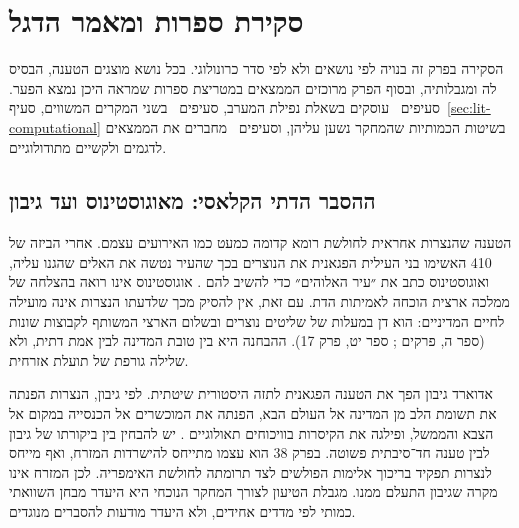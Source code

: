 
\chapter{סקירת ספרות ומאמר הדגל}
\label{ch:literature}

הסקירה בפרק זה בנויה לפי נושאים ולא לפי סדר כרונולוגי. בכל נושא מוצגים הטענה, הבסיס לה ומגבלותיה, ובסוף הפרק מרוכזים הממצאים במטריצת ספרות שמראה היכן נמצא הפער. סעיפים~\LR{\ref{sec:lit-classic}--\ref{sec:lit-wealth}} עוסקים בשאלת נפילת המערב, סעיפים~\LR{\ref{sec:lit-east}--\ref{sec:lit-franks}} בשני המקרים המשווים, סעיף~\ref{sec:lit-computational} בשיטות הכמותיות שהמחקר נשען עליהן, וסעיפים~\LR{\ref{sec:lit-models}--\ref{sec:lit-method-issues}} מחברים את הממצאים לדגמים ולקשיים מתודולוגיים.

\section{ההסבר הדתי הקלאסי: מאוגוסטינוס ועד גיבון}
\label{sec:lit-classic}

הטענה שהנצרות אחראית לחולשת רומא קדומה כמעט כמו האירועים עצמם. אחרי הביזה של 410 האשימו בני העילית הפגאנית את הנוצרים בכך שהעיר נטשה את האלים שהגנו עליה, ואוגוסטינוס כתב את ״עיר האלוהים״ כדי להשיב להם \cite{augustine_citygod}. אוגוסטינוס אינו רואה בהצלחה של ממלכה ארצית הוכחה לאמיתות הדת. עם זאת, אין להסיק מכך שלדעתו הנצרות אינה מועילה לחיים המדיניים: הוא דן במעלות של שליטים נוצרים ובשלום הארצי המשותף לקבוצות שונות (ספר ה, פרקים ; ספר יט, פרק 17). ההבחנה היא בין טובת המדינה לבין אמת דתית, ולא שלילה גורפת של תועלת אזרחית.

אדוארד גיבון הפך את הטענה הפגאנית לתזה היסטורית שיטתית. לפי גיבון, הנצרות הפנתה את תשומת הלב מן המדינה אל העולם הבא, הפנתה את המוכשרים אל הכנסייה במקום אל הצבא והממשל, ופילגה את הקיסרות בוויכוחים תאולוגיים \cite{gibbon_decline}. יש להבחין בין ביקורתו של גיבון לבין טענה חד־סיבתית פשוטה. בפרק 38 הוא עצמו מתייחס להישרדות המזרח, ואף מייחס לנצרות תפקיד בריכוך אלימות הפולשים לצד תרומתה לחולשת האימפריה. לכן המזרח אינו מקרה שגיבון התעלם ממנו. מגבלת הטיעון לצורך המחקר הנוכחי היא היעדר מבחן השוואתי כמותי לפי מדדים אחידים, ולא היעדר מודעות להסברים מנוגדים.

